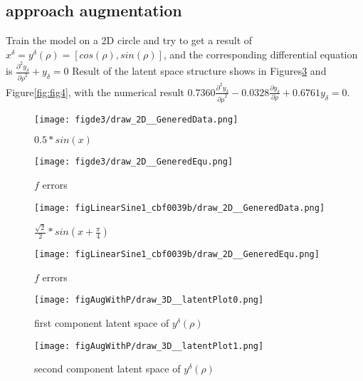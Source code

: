 \documentclass{article}
\begin{document}
\subsection{approach augmentation}
Train the model on a 2D circle and try to
get a result of $x^\delta=y^\delta(\rho)=[cos(\rho),sin(\rho)]$,
and the corresponding differential equation is
$\frac{\partial^2 y_\delta}{{\partial \rho}^2}+y_\delta=0$
Result of the latent space structure shows in Figures\ref{fig:fig3} and Figure\ref{fig:fig4}, with the
numerical result $0.7360\frac{\partial^2 y_\delta}{{\partial \rho}^2}-0.0328\frac{\partial y_\delta}{{\partial \rho}}+  0.6761y_\delta=0$.

\begin{figure}[ht!]
    \centering
    \begin{minipage}{0.45\textwidth}
        \centering
        \texttt{[image: figde3/draw\_2D\_\_GeneredData.png]} %
        \caption{$0.5*sin(x)$}
        \label{fig:fig1}
    \end{minipage}\hfill
    \begin{minipage}{0.45\textwidth}
        \centering
        \texttt{[image: figde3/draw\_2D\_\_GeneredEqu.png]} %
        \caption{$f$ errors}
    \end{minipage}
\end{figure}
\begin{figure}[ht!]
    \centering
    \begin{minipage}{0.45\textwidth}
        \centering
        \texttt{[image: figLinearSine1\_cbf0039b/draw\_2D\_\_GeneredData.png]} %
        \caption{$\frac{\sqrt{2}}{2}*sin(x+\frac{\pi}{4})$}
        \label{fig:fig2}
    \end{minipage}\hfill
    \begin{minipage}{0.45\textwidth}
        \centering
        \texttt{[image: figLinearSine1\_cbf0039b/draw\_2D\_\_GeneredEqu.png]} %
        \caption{$f$ errors}
    \end{minipage}
\end{figure}
\begin{figure}[ht!]
    \centering
    \begin{minipage}{0.45\textwidth}
        \centering
        \texttt{[image: figAugWithP/draw\_3D\_\_latentPlot0.png]} %
        \caption{first component latent space of $y^\delta(\rho)$}
        \label{fig:fig3}
    \end{minipage}\hfill
    \begin{minipage}{0.45\textwidth}
        \centering
        \texttt{[image: figAugWithP/draw\_3D\_\_latentPlot1.png]} %
        \caption{second component latent space of $y^\delta(\rho)$}
    \end{minipage}
\end{figure}
\end{document}
